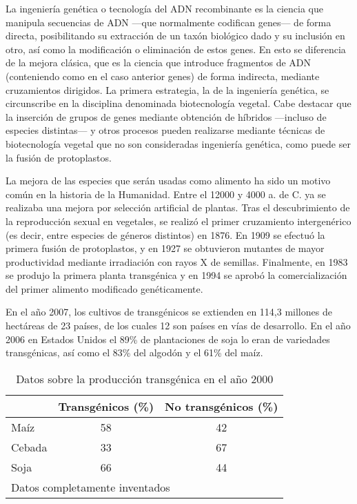 \documentclass[11pt,a4paper]{article}
\begin{document}
La ingeniería genética o tecnología del ADN recombinante es la ciencia que manipula secuencias de ADN ---que normalmente codifican genes--- de forma directa, posibilitando su extracción de un taxón biológico dado y su inclusión en otro, así como la modificación o eliminación de estos genes. En esto se diferencia de la mejora clásica, que es la ciencia que introduce fragmentos de ADN (conteniendo como en el caso anterior genes) de forma indirecta, mediante cruzamientos dirigidos.
 La primera estrategia, la de la ingeniería genética, se circunscribe en la disciplina denominada biotecnología vegetal. Cabe destacar que la inserción de grupos de genes mediante obtención de híbridos ---incluso de especies distintas--- y otros procesos pueden realizarse mediante técnicas de biotecnología vegetal que no son consideradas ingeniería genética, como puede ser la fusión de protoplastos.


La mejora de las especies que serán usadas como alimento ha sido un motivo común en la historia de la Humanidad. Entre el 12000 y 4000 a. de C. ya se realizaba una mejora por selección artificial de plantas. Tras el descubrimiento de la reproducción sexual en vegetales, se realizó el primer cruzamiento intergenérico (es decir, entre especies de géneros distintos) en 1876. En 1909 se efectuó la primera fusión de protoplastos, y en 1927 se obtuvieron mutantes de mayor productividad mediante irradiación con rayos X de semillas. Finalmente, en 1983 se produjo la primera planta transgénica y en 1994 se aprobó la comercialización del primer alimento modificado genéticamente.


En el año 2007, los cultivos de transgénicos se extienden en 114,3 millones de hectáreas de 23 países, de los cuales 12 son países en vías de desarrollo.
 En el año 2006 en Estados Unidos el 89\% de plantaciones de soja lo eran de variedades transgénicas, así como el 83\% del algodón y el 61\% del maíz.



\begin{table}[h!]
\centering
\begin{tabular}{|l|c|c|}
\hline
     &  Transgénicos (\%)  & No transgénicos (\%)  \\
\hline\hline
Maíz  &    58  &   42 \\
\hline
Cebada &   33   &  67   \\
\hline
Soja   &  66   & 44 \\
\hline
\multicolumn{3}{l}{\footnotesize Datos completamente inventados}
\end{tabular}
\caption{Datos sobre la producción transgénica en el año 2000}
\label{tabla.transg3}
\end{table}
\end{document}

